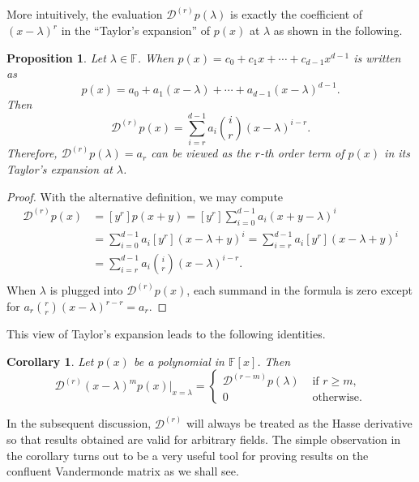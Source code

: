 \documentclass{article}
\newtheorem{proposition}[theorem]{Proposition}
\newtheorem{corollary}[theorem]{Corollary}
\theoremstyle{definition}
\begin{document}
More intuitively, the evaluation $\mathcal{D}^{(r)}p(\lambda)$ is exactly the coefficient of $(x - \lambda)^r$ in the 
``Taylor's expansion'' of $p(x)$ at $\lambda$ as shown in the following. 

\begin{proposition}
\label{prop:taylor}
Let $\lambda\in\mathbb{F}$.  When $p(x) = c_0 + c_1x + \cdots + c_{d-1}x^{d-1}$ is written as 
\[
    p(x) = a_0 + a_1(x - \lambda) + \cdots + a_{d-1}(x - \lambda)^{d-1}.
\]
Then 
\[
    \mathcal{D}^{(r)}p(x) = \sum_{i=r}^{d-1} a_i \binom{i}{r}(x - \lambda)^{i-r}.
\]
Therefore, $\mathcal{D}^{(r)}p(\lambda) = a_r$ can be viewed as the $r$-th order term of $p(x)$ in its Taylor's expansion at $\lambda$.  
\end{proposition}
\begin{proof}
With the alternative definition, we may compute
\[
    \begin{aligned}
        \mathcal{D}^{(r)}p(x) &= [y^r]p(x + y) = [y^r] \sum_{i=0}^{d-1} a_i (x + y - \lambda)^i \\
        &= \sum_{i=0}^{d-1} a_i [y^r] (x - \lambda + y)^i 
        = \sum_{i=r}^{d-1} a_i [y^r] (x - \lambda + y)^i \\
        &= \sum_{i=r}^{d-1} a_i \binom{i}{r} (x - \lambda)^{i-r}. \\
    \end{aligned}
\]
When $\lambda$ is plugged into $\mathcal{D}^{(r)}p(x)$, each summand in the formula is zero except for $a_r \binom{r}{r} (x - \lambda)^{r - r} = a_r$.  
\end{proof}

This view of Taylor's expansion leads to the following identities.

\begin{corollary}
\label{cor:hasseshift}
Let $p(x)$ be a polynomial in $\mathbb{F}[x]$.  Then 
\[
    \mathcal{D}^{(r)}(x - \lambda)^m p(x) \big|_{x = \lambda} = 
    \begin{cases}
        \mathcal{D}^{(r - m)}p(\lambda) & \text{ if } r \geq m, \\
        0 & \text{ otherwise.}
    \end{cases}
\]

\end{corollary}

In the subsequent discussion, $\mathcal{D}^{(r)}$ will always be treated as the Hasse 
derivative so that results obtained are valid
for arbitrary fields. The simple observation in the corollary turns out to be a very useful tool for proving
results on the confluent Vandermonde matrix as we shall see.
\end{document}
